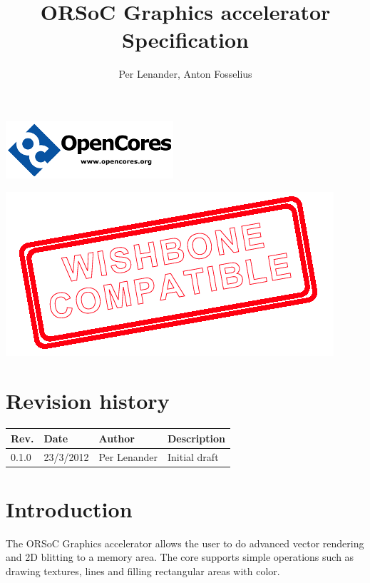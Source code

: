 \documentclass[10pt,a4paper]{article}
\author{Per Lenander, Anton Fosselius}
\title{ORSoC Graphics accelerator Specification}
\begin{document}
\maketitle

\begin{center}
\includegraphics[scale=1.0]{../pictures/OpenCores}
\end{center}

\begin{center}
\includegraphics[scale=0.50]{../pictures/wb_compatible}
\end{center}

\newpage

\section*{Revision history}
\begin{tabular}{|p{1cm}|p{2cm}|p{3cm}|p{7cm}|}
\hline \textbf{Rev.} & \textbf{Date} & \textbf{Author} & \textbf{Description} \\
\hline 
\hline 0.1.0 & 23/3/2012 & Per Lenander & Initial draft \\
\hline 
\end{tabular} 
\newpage

\tableofcontents
\newpage

\section{Introduction}
The ORSoC Graphics accelerator allows the user to do advanced vector rendering and 2D blitting to a memory area. The core supports simple operations such as drawing textures, lines and filling rectangular areas with color.
\end{document}
